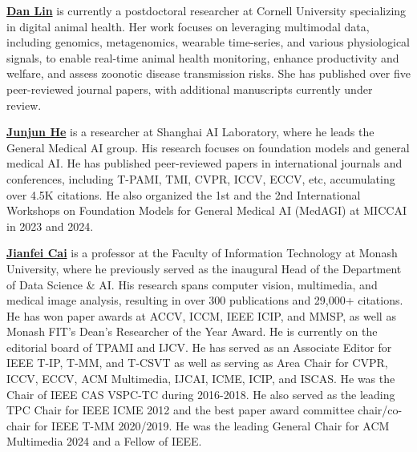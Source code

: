 \documentclass{article}
\begin{document}
\noindent
\textbf{\href{https://lindan1128.github.io/}{Dan Lin}} is currently a postdoctoral researcher at Cornell University specializing in digital animal health. Her work focuses on leveraging multimodal data, including genomics, metagenomics, wearable time-series, and various physiological signals, to enable real-time animal health monitoring, enhance productivity and welfare, and assess zoonotic disease transmission risks. She has published over five peer-reviewed journal papers, with additional manuscripts currently under review.

\noindent
\textbf{\href{https://junjun2016.github.io/}{Junjun He}} is a researcher at Shanghai AI Laboratory, where he leads the General Medical AI group. His research focuses on foundation models and general medical AI.%
He has published peer-reviewed papers in international journals and conferences, including T-PAMI, TMI, CVPR, ICCV, ECCV, etc, accumulating over 4.5K citations. %
He also organized the 1st and the 2nd International Workshops on Foundation Models for General Medical AI (MedAGI) at MICCAI in 2023 and 2024.

\noindent
\textbf{\href{https://research.monash.edu/en/persons/jianfei-cai}{Jianfei Cai}} is a professor at the Faculty of Information Technology at Monash University, where he previously served as the inaugural Head of the Department of Data Science \& AI. %
His research spans computer vision, multimedia, and medical image analysis, resulting in over 300 publications and 29,000+ citations. 
He has won paper awards at ACCV, ICCM, IEEE ICIP, and MMSP, as well as Monash FIT’s Dean's Researcher of the Year Award. 
He is currently on the editorial board of TPAMI and IJCV. 
He has served as an Associate Editor for IEEE T-IP, T-MM, and T-CSVT as well as serving as Area Chair for CVPR, ICCV, ECCV, ACM Multimedia, IJCAI, ICME, ICIP, and ISCAS. 
He was the Chair of IEEE CAS VSPC-TC during 2016-2018. He also served as the leading TPC Chair for IEEE ICME 2012 and the best paper award committee chair/co-chair for IEEE T-MM 2020/2019. He was the leading General Chair for ACM Multimedia 2024 and a Fellow of IEEE.
\end{document}
